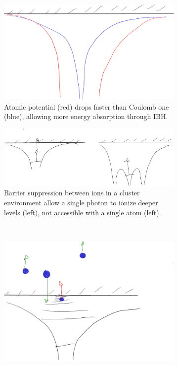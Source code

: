 \begin{figure}
 \centering
    \begin{subfigure}{0.48\columnwidth}
        \centering
        \includegraphics[width=\textwidth]{figures/mockups/heating_atomic_potential}
        \caption{Atomic potential (red) drops faster than Coulomb one (blue),
                 allowing more energy absorption through IBH.}
        \label{fig:heating:atomic_pot}
    \end{subfigure}
%
    \begin{subfigure}{0.48\columnwidth}
        \centering
        \includegraphics[width=\textwidth]{figures/mockups/heating_barrier_sup}
        \caption{Barrier suppression between ions in a cluster environment allow
                 a single photon to ionize deeper levels (left), not accessible
                 with a single atom (left).}
        \label{fig:heating:barrier}
    \end{subfigure}
\\
    \begin{subfigure}{0.48\columnwidth}
        \centering
        \includegraphics[width=\textwidth]{figures/mockups/heating_mbr}

\end{subfigure}
\end{figure}
